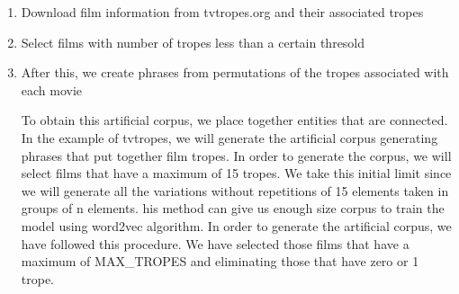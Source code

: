 \documentclass[letterpaper]{article}
\begin{document}
	\begin{enumerate}
		\item Download film information from tvtropes.org and their associated tropes
		\item Select films with number of tropes less than a certain thresold
		\item After this, we create phrases from permutations of the tropes associated with each movie


	
	

	To obtain this artificial corpus, we place together entities
	that are connected. In the example of tvtropes, we will
	generate the artificial corpus generating phrases that put
	together film tropes. In order to generate the corpus, we will
	select films that have a maximum of 15 tropes. We take this
	initial limit since we will generate all the variations
	without repetitions of 15 elements taken in groups of n
	elements. his method can give us enough size corpus to train
	the model using word2vec algorithm.
	In order to generate the artificial corpus, we have followed this procedure. We have selected those films that have a maximum of MAX\_TROPES and eliminating those that have zero or 1 trope.  
	
	\end{enumerate}
		
\end{document}
